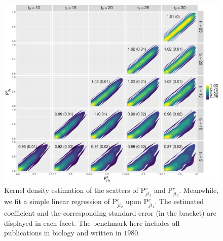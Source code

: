 \begin{figure}[ht!]
    \centering
    \includegraphics[width=\textwidth]{figures/pred_power/pubrp/scatter_bio1980.eps}
    \caption{Kernel density estimation of the scatters of P$_{j t_1}^c$ and P$_{j t_2}^c$. Meanwhile, we fit a simple linear regression of P$_{j t_2}^c$ upon P$_{j t_1}^c$. The estimated coefficient and the corresponding standard error (in the bracket) are displayed in each facet. The benchmark here includes all publications in biology and written in $1980$.}
    \label{fig:scatter_pubrp_bio1980}
\end{figure}


